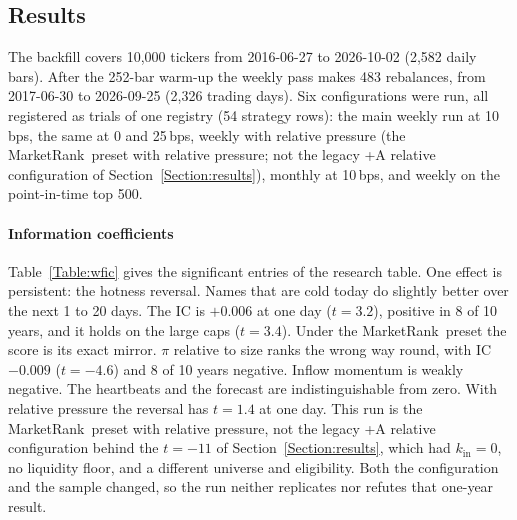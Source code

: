 \documentclass[preprint,3p,twocolumn]{elsarticle}
\newcommand{\MR}{MarketRank}
\begin{document}
\subsection{Results}
\label{Section:wfresults}

The backfill covers 10,000 tickers from 2016-06-27 to 2026-10-02 (2,582 daily bars). After the 252-bar warm-up the weekly pass makes 483 rebalances, from 2017-06-30 to 2026-09-25 (2,326 trading days). Six configurations were run, all registered as trials of one registry (54 strategy rows): the main weekly run at 10\,bps, the same at 0 and 25\,bps, weekly with relative pressure (the \MR\ preset with relative pressure; not the legacy +A relative configuration of Section~\ref{Section:results}), monthly at 10\,bps, and weekly on the point-in-time top 500.

\paragraph{Information coefficients} Table~\ref{Table:wfic} gives the significant entries of the research table. One effect is persistent: the hotness reversal. Names that are cold today do slightly better over the next 1 to 20 days. The IC is $+0.006$ at one day ($t=3.2$), positive in 8 of 10 years, and it holds on the large caps ($t=3.4$). Under the \MR\ preset the score is its exact mirror. $\pi$ relative to size ranks the wrong way round, with IC $-0.009$ ($t=-4.6$) and 8 of 10 years negative. Inflow momentum is weakly negative. The heartbeats and the forecast are indistinguishable from zero. With relative pressure the reversal has $t=1.4$ at one day. This run is the \MR\ preset with relative pressure, not the legacy +A relative configuration behind the $t=-11$ of Section~\ref{Section:results}, which had $k_{\mathrm{in}}=0$, no liquidity floor, and a different universe and eligibility. Both the configuration and the sample changed, so the run neither replicates nor refutes that one-year result.
\end{document}

